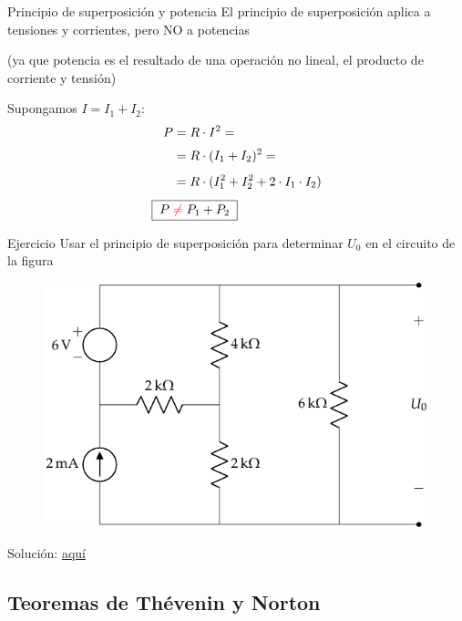 \documentclass[aspectratio=169, xcolor={usenames,svgnames,dvipsnames}]{beamer}
\begin{document}
\begin{frame}{Principio de superposición y potencia}
    El principio de superposición aplica a tensiones y corrientes, pero \alert{NO a potencias}
    
    (ya que potencia es el resultado de una \alert{operación no lineal}, el producto de corriente y tensión)
    
    \vspace{5mm}
    
    Supongamos \(I = I_1 + I_2\):
    \begin{align*}
      P &= R \cdot I^2 =\\[2pt]
           &= R \cdot (I_1 + I_2)^2 =\\[4pt]
           &=R \cdot (I_1^2 + I_2^2 + 2\cdot I_1 \cdot I_2)\\[4pt]
      \Aboxed{\; P \; &\textcolor{red}{\neq} \; P_1 + P_2 \;}
    \end{align*}
\end{frame}


\begin{frame}{Ejercicio}
    \vspace{5mm}
    Usar el principio de superposición para determinar $U_0$ en el circuito de la figura
    
    \vspace{3mm}
    \begin{figure}[H]
        \centering
        \includegraphics[width=0.6\linewidth]{../figs/ej_superposicion_cc.pdf}
    \end{figure}
    
    \vspace{-4mm}
    \alert{Solución}: \href{https://raw.githubusercontent.com/ETSIDI-IE/tc/master/docs/ejercicios_clase/TC1_01_Ejercicio_clase3_LBB.pdf}{aquí}
\end{frame}


\subsection{Teoremas de Thévenin y Norton}
\end{document}
